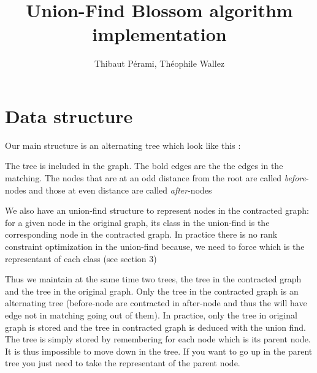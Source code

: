 \documentclass[a4paper,12pt]{article}
\title{Union-Find Blossom algorithm implementation}
\author{Thibaut Pérami, Théophile Wallez}
\renewcommand{\(}{\left(}
\renewcommand{\)}{\right)}
\begin{document}
\maketitle

\section{Data structure}

Our main structure is an alternating tree which look like this :

\begin{center}
\end{center}

The tree is included in the graph. The bold edges are the the edges in the
matching. The nodes that are at an odd distance from the root are called
\emph{before}-nodes and those at even distance are called \emph{after}-nodes

We also have an union-find structure to represent nodes in the contracted graph: for a
given node in the original graph, its class in the union-find is the
corresponding node in the contracted graph. In practice there is no rank
constraint optimization in the union-find because, we need to force which is
the representant of each class (see section 3)

Thus we maintain at the same time two trees, the tree in the contracted graph and the
tree in the original graph. Only the tree in the contracted graph is an
alternating tree (before-node are contracted in after-node and thus the will
have edge not in matching going out of them).
In practice, only the tree in original graph is
stored and the tree in contracted graph is deduced with the union find. The tree
is simply stored by remembering for each node which is its parent node. It is
thus impossible to move down in the tree. If you want to go up in the parent
tree you just need to take the representant of the parent node.
\end{document}
